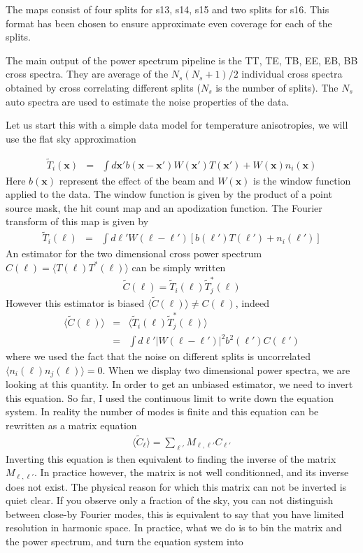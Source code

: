 \documentclass[a4paper, 11pt]{article}
\def\ba{\begin{eqnarray}}
\def\ea{\end{eqnarray}}
\begin{document}
The maps consist of four splits for s13, s14, s15 and two splits for s16. This format has been chosen to ensure  approximate even coverage for each of the splits. 

The main output of the power spectrum pipeline is  the TT, TE, TB, EE, EB, BB cross spectra. They are average of the $N_{s}(N_{s}+1)/2$ individual cross spectra obtained by cross correlating different splits  ($N_{s}$ is the number of splits). The $N_{s}$ auto spectra are  used to estimate the noise properties of the data. 

Let us start this with a simple data model for temperature anisotropies, we will use the flat sky approximation

\ba
\tilde{T}_{i}(\bm{x}) &=& \int d\bm{x'} b( \bm{x}-\bm{x'}) W(\bm{x'}) T(\bm{x'})+W( \bm{x}) n_{i} (\bm{x})  
\ea
Here $b( \bm{x})$ represent the effect of the beam and $W( \bm{x})$ is the window function applied to the data. The window function is given by the product of a point source mask, the hit count map and an apodization function. The Fourier transform of this map is given by
\ba
\tilde{T}_{i}(\bm{\ell}) &=& \int d\bm{\ell'} W (\bm{\ell}-\bm{\ell'}) \left[ b(\bm{\ell'}) T(\bm{\ell'}) + n_{i}(\bm{\ell'})\right] \label{eq:Tfourier}
\ea
An estimator for the two dimensional cross power spectrum $C(\bm{\ell})=\langle T(\bm{\ell}) T^{*}(\bm{\ell}) \rangle $ can be simply written  
\ba
\tilde{C}(\bm{\ell})=  \tilde{T}_{i}(\bm{\ell}) \tilde{T}^{*}_{j}(\bm{\ell})
\ea
However this estimator is biased $\langle \tilde{C}(\bm{\ell}) \rangle \neq C(\bm{\ell})$, indeed
\ba
\langle \tilde{C}(\bm{\ell}) \rangle &=& \langle  \tilde{T}_{i}(\bm{\ell}) \tilde{T}^{*}_{j}(\bm{\ell}) \rangle \\
&=&  \int d\bm{\ell'} | W (\bm{\ell}-\bm{\ell'})|^{2}b^{2}(\bm{\ell'})  C(\bm{\ell'})
\ea
where we used the fact that the noise on different splits is uncorrelated $ \langle n_{i}(\bm{\ell}) n_{j}(\bm{\ell}) \rangle=0$. When we display two dimensional power spectra, we are looking at this quantity. In order to get an unbiased estimator, we need to invert this equation. So far, I used the continuous limit to write down the equation system. In reality the number of modes is finite and this equation can be rewritten as a matrix equation
\ba
\langle \tilde{C}_{\bm{\ell}} \rangle= \sum_{\bm{\ell}'} M_{\bm{\ell}, \bm{\ell'}}  C_{\bm{\ell'}}
\ea 
Inverting this equation is then equivalent to finding the inverse of the matrix $ M_{\bm{\ell}, \bm{\ell'}} $. In practice however, the matrix is not well conditionned, and its inverse does not exist. The physical reason for which this matrix can not be inverted is quiet clear. If you observe only a fraction of the sky, you can not distinguish between close-by Fourier modes, this is equivalent to say that you have limited resolution in harmonic space. In practice, what we do is to bin the matrix and the power spectrum, and turn the equation system into
\end{document}
